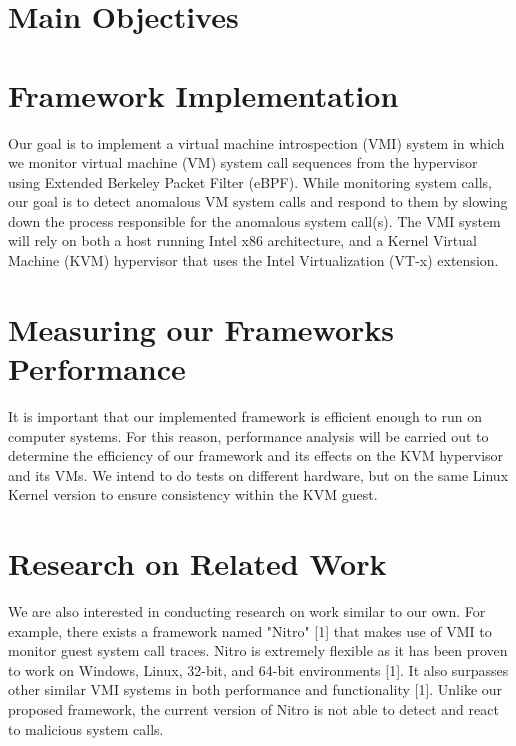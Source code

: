 \documentclass{article}
\begin{document}
\begin{flushleft}
\vspace{3cm}
\begin{spacing}{1.5}

\section*{\huge Main Objectives}

\section*{\Large Framework Implementation}
{\large Our goal is to implement a virtual machine introspection (VMI) system in which we monitor virtual machine (VM) system call sequences from the hypervisor using Extended Berkeley Packet Filter (eBPF). While monitoring system calls, our goal is to detect anomalous VM system calls and respond to them by slowing down the process responsible for the anomalous system call(s). The VMI system will rely on both a host running Intel x86 architecture, and a Kernel Virtual Machine (KVM) hypervisor that uses the Intel Virtualization (VT-x) extension.}

\section*{\Large Measuring our Frameworks Performance}

{\large It is important that our implemented framework is efficient enough to run on computer systems. For this reason, performance analysis will be carried out to determine the efficiency of our framework and its effects on the KVM hypervisor and its VMs. We intend to do tests on different hardware, but on the same Linux Kernel version to ensure consistency within the KVM guest.}

\section*{\Large Research on Related Work}

{\large We are also interested in conducting research on work similar to our own. For example, there exists a framework named "Nitro" [1] that makes use of VMI to monitor guest system call traces. Nitro is extremely flexible as it has been proven to work on Windows, Linux, 32-bit, and 64-bit environments [1]. It also surpasses other similar VMI systems in both performance and functionality [1]. Unlike our proposed framework, the current version of Nitro is not able to detect and react to malicious system calls.}


\end{spacing}
\end{flushleft}
\end{document}
